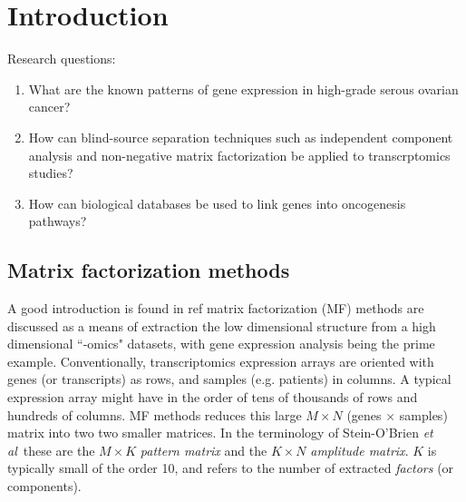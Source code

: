 \documentclass[draft, tikz, 12pt,a4paper,oneside,fleqn]{article}
\newcommand{\etal}{{\em et al\/}}
\begin{document}
\newpage
\setcounter{page}{1}



\section{Introduction}

Research questions:  
\begin{enumerate}
\item What are the known patterns of gene expression in high-grade serous ovarian cancer?
\item How can blind-source separation techniques such as independent component analysis and non-negative matrix factorization be applied to transcrptomics studies?
\item How can biological databases be used to link genes into oncogenesis pathways?
\end{enumerate}

\subsection{Matrix factorization methods}
\label{sec-matrix-factorization-intro}

A good introduction is found in ref \cite{Stein-OBrien2018} matrix factorization (MF) methods are discussed as a means of extraction the low dimensional structure from a high dimensional ``-omics" datasets, with gene expression analysis being the prime example.  
Conventionally, transcriptomics expression arrays are oriented with genes (or transcripts) as rows, and samples (e.g. patients) in columns.   
A typical expression array might have in the order of tens of thousands of rows and hundreds of columns.  
MF methods reduces this large $M \times N$ (genes $\times$ samples) matrix into two two smaller matrices.
In the terminology of Stein-O'Brien \etal\ these are the $M \times K$ \emph{pattern matrix} and the $K \times N$ \emph{amplitude matrix}.  $K$ is typically small of the order 10, and refers to the number of extracted \emph{factors} (or components). 
\end{document}
